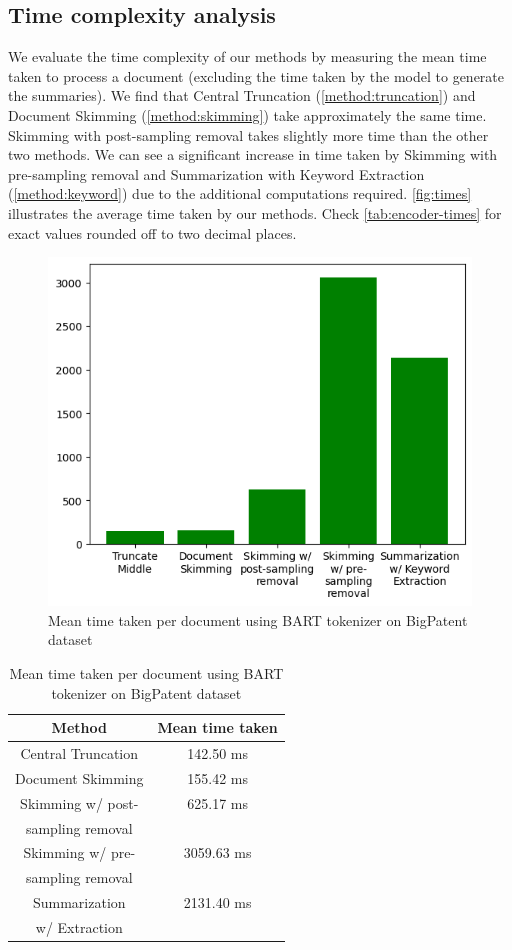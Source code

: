 	\subsection*{Time complexity analysis}

		We evaluate the time complexity of our methods by measuring the mean time taken to process
		a document (excluding the time taken by the model to generate the summaries).
		We find that Central Truncation (\ref{method:truncation}) and Document Skimming
		(\ref{method:skimming}) take approximately the same time.
		Skimming with post-sampling removal takes slightly more time than the other two methods.
		We can see a significant increase in time taken by Skimming with pre-sampling removal
		and Summarization with Keyword Extraction (\ref{method:keyword}) due to the additional
		computations required.
		\autoref{fig:times} illustrates the average time taken by our methods.
		Check \autoref{tab:encoder-times} for exact values rounded off to two decimal places.

		\begin{figure}[!ht]
			\centering
			\includegraphics[width=.48\textwidth]{Images/encoder-times.png}
			\caption{Mean time taken per document using BART tokenizer on BigPatent dataset}
			\label{fig:times}
		\end{figure}

		\begin{table}[!ht]
			\centering

			\begin{tabular}{c c}
				\hline
				Method & Mean time taken \\
				\hline
				Central Truncation & 142.50 ms \\
				Document Skimming & 155.42 ms \\
				Skimming w/ post- & 625.17 ms \\
				sampling removal & \\
				Skimming w/ pre- & 3059.63 ms \\
				sampling removal & \\
				Summarization & 2131.40 ms \\
				w/ Extraction & \\
				\hline
			\end{tabular}

			\caption{Mean time taken per document using BART tokenizer on BigPatent dataset}
			\label{tab:encoder-times}
		\end{table}
